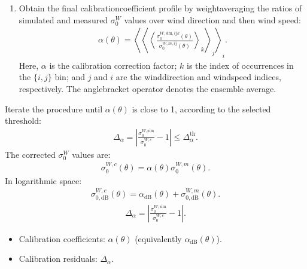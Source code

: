 \documentclass[a4paper,10pt,english]{sphinxmanual}
\begin{document}
\begin{enumerate}
\item {} 
\sphinxAtStartPar
Obtain the final calibration\sphinxhyphen{}coefficient profile by weight\sphinxhyphen{}averaging the
ratios of simulated and measured \(\sigma_0^W\) values over wind
direction and then wind speed:
\begin{equation*}
\begin{split}\alpha(\theta)
= \left\langle
  \left\langle
  \left\langle
  \frac{\sigma_{0}^{W,\mathrm{sim},ijk}(\theta)}
       {\sigma_{0}^{W,m,ij}(\theta)}
  \right\rangle_k
  \right\rangle_j
  \right\rangle_i .\end{split}
\end{equation*}
\sphinxAtStartPar
Here, \(\alpha\) is the calibration correction factor; \(k\) is
the index of occurrences in the \(\{i,j\}\) bin; and \(j\) and
\(i\) are the wind\sphinxhyphen{}direction and wind\sphinxhyphen{}speed indices, respectively. The
angle\sphinxhyphen{}bracket operator denotes the ensemble average.

\end{enumerate}

\sphinxAtStartPar
Iterate the procedure until \(\alpha(\theta)\) is close to 1, according to
the selected threshold:
\begin{equation*}
\begin{split}\Delta_{\alpha}
= \left|
   \frac{\sigma_{0}^{W,\mathrm{sim}}}{\sigma_{0}^{W,c}} - 1
  \right|
\leq \Delta_{\alpha}^{\mathrm{th}} .\end{split}
\end{equation*}
\sphinxAtStartPar
The corrected \(\sigma_0^W\) values are:
\begin{equation*}
\begin{split}\sigma_{0}^{W,c}(\theta)
= \alpha(\theta)\sigma_{0}^{W,m}(\theta) .\end{split}
\end{equation*}
\sphinxAtStartPar
In logarithmic space:
\begin{equation*}
\begin{split}\sigma_{0,\mathrm{dB}}^{W,c}(\theta)
= \alpha_{\mathrm{dB}}(\theta)
  + \sigma_{0,\mathrm{dB}}^{W,m}(\theta) .\end{split}
\end{equation*}
\sphinxAtStartPar
{}
\begin{equation*}
\begin{split}\Delta_{\alpha}
= \left|
   \frac{\sigma_{0}^{W,\mathrm{sim}}}{\sigma_{0}^{W,c}} - 1
  \right| .\end{split}
\end{equation*}
\sphinxAtStartPar
{}
\begin{itemize}
\item {} 
\sphinxAtStartPar
Calibration coefficients: \(\alpha(\theta)\) (equivalently
\(\alpha_{\mathrm{dB}}(\theta)\)).

\item {} 
\sphinxAtStartPar
Calibration residuals: \(\Delta_{\alpha}\).

\end{itemize}
\end{document}
